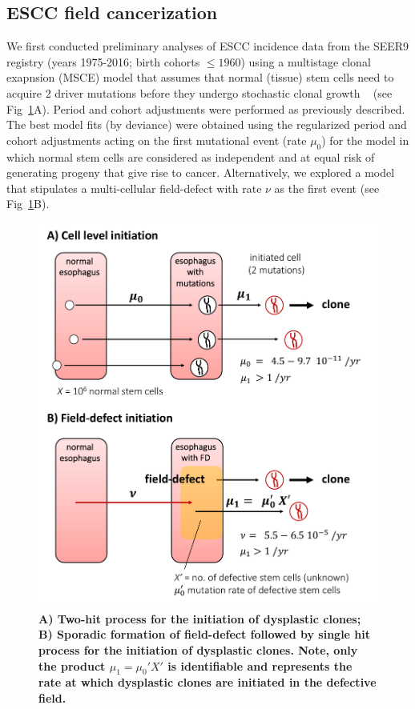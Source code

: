 \documentclass[10pt,letterpaper]{article}
\begin{document}
\subsection*{ESCC field cancerization}
We first conducted preliminary analyses of ESCC incidence data from the SEER9 registry (years 1975-2016; birth cohorts $\leq 1960$) using a multistage clonal exapnsion (MSCE) model that assumes that normal (tissue) stem cells need to acquire 2 driver mutations before they undergo stochastic clonal growth ~\cite{Luebeck2013} (see Fig~\ref{fig3}A). Period and cohort adjustments were performed as previously described. The best model fits (by deviance) were obtained using the regularized period and cohort adjustments acting on the first mutational event (rate $\mu_0$) for the model in which normal stem cells are considered as independent and at equal risk of generating progeny that give rise to cancer. Alternatively, we explored a model that stipulates a multi-cellular field-defect with rate $\nu$ as the first event (see Fig~\ref{fig3}B). 
\medskip
\begin{figure}[!ht]
\begin{adjustwidth}{0.25in}{0in} %
\includegraphics[scale=0.5, trim=0 0 0 0]{Fig3.pdf}
\caption{{\bf A) Two-hit process for the initiation of dysplastic clones; B) Sporadic formation of field-defect followed by single hit process for the initiation of dysplastic clones. Note, only the product $\mu_1=\mu_0'X'$ is identifiable and represents the rate at which dysplastic clones are initiated in the defective field.}}
\label{fig3}
\end{adjustwidth}
\end{figure}
\end{document}
